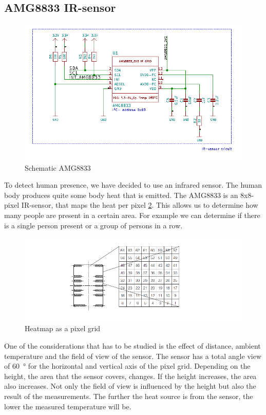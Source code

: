 \documentclass[11pt,a4paper]{article}
\begin{document}
\subsection{AMG8833 IR-sensor}
\begin{figure}[H]
	\centering
	\includegraphics[width=0.8\linewidth]{Schematic AMG8833.png}
	\caption{Schematic AMG8833}
	\label{fig:AMG8833}
\end{figure}
To detect human presence, we have decided to use an infrared sensor. The human body produces quite some body heat that is emitted. The AMG8833 is an 8x8-pixel IR-sensor, that maps the heat per pixel \ref{fig:heatmap}. This allows us to determine how many people are present in a certain area. For example we can determine if there is a single person present or a group of persons in a row.
\begin{figure}[H]
	\centering
	\includegraphics[width=0.8\linewidth]{heat map AMG8833.png}
	\caption{Heatmap as a pixel grid}
	\label{fig:heatmap}
\end{figure}
One of the considerations that has to be studied is the effect of distance, ambient temperature and the field of view of the sensor. The sensor has a total angle view of \SI{60}{\degree} \label{fig:angleview} for the horizontal and vertical axis of the pixel grid. Depending on the height, the area that the sensor covers, changes. If the height increases, the area also increases. Not only the field of view is influenced by the height but also the result of the measurements. The further the heat source is from the sensor, the lower the measured temperature will be.
\end{document}

